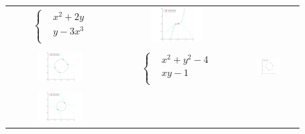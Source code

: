 \documentclass[a4paper]{article}
\theoremstyle{definition}
\theoremstyle{definition}
\theoremstyle{remark}
\theoremstyle{definition}
\begin{document}
\begin{figure}[htb]
\begin{tabular}{c c c}
        $\left\{\begin{aligned}
                    &x^2 + 2y  \\
                    &y - 3x^3 \\
        \end{aligned}\right.$ &
        \includegraphics[width=0.45\textwidth,valign=c]{../plots/solutions2_6.png} \\
        \vspace{0.5cm} \\
        \includegraphics[width=0.45\textwidth,valign=c]{../plots/solutions3.png} &
        $\left\{\begin{aligned}
                    &x^2 + y^2 - 4 \\
                    &xy - 1 \\
        \end{aligned}\right.$ &
        \includegraphics[width=0.45\textwidth,valign=c]{../plots/solutions3_6.png} \\
        \vspace{0.5cm} \\
        \includegraphics[width=0.45\textwidth,valign=c]{../plots/solutions4.png} &

\end{tabular}
\end{figure}
\end{document}
